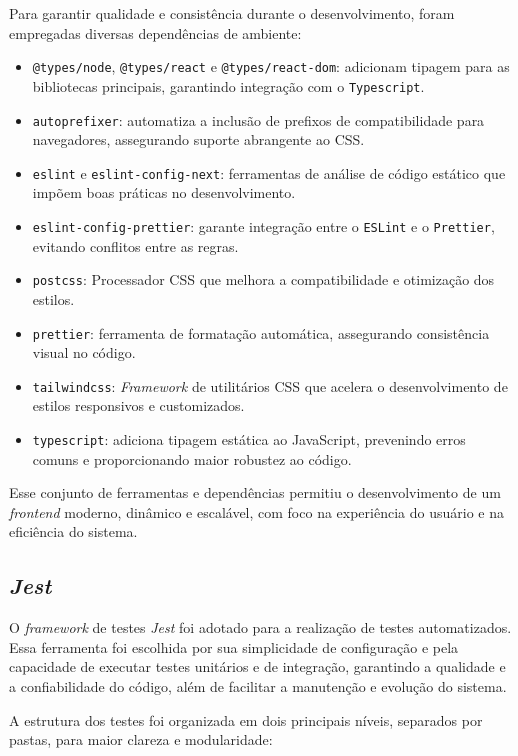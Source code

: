 Para garantir qualidade e consistência durante o desenvolvimento, foram empregadas diversas dependências de ambiente:

\begin{itemize} 
  \item \texttt{@types/node}, \texttt{@types/react} e \texttt{@types/react-dom}: adicionam tipagem para as bibliotecas principais, garantindo integração com o \texttt{Typescript}. 
  \item \texttt{autoprefixer}: automatiza a inclusão de prefixos de compatibilidade para navegadores, assegurando suporte abrangente ao CSS. 
  \item \texttt{eslint} e \texttt{eslint-config-next}: ferramentas de análise de código estático que impõem boas práticas no desenvolvimento. 
  \item \texttt{eslint-config-prettier}: garante integração entre o \texttt{ESLint} e o \texttt{Prettier}, evitando conflitos entre as regras. 
  \item \texttt{postcss}: Processador CSS que melhora a compatibilidade e otimização dos estilos. 
  \item \texttt{prettier}: ferramenta de formatação automática, assegurando consistência visual no código. 
  \item \texttt{tailwindcss}: \textit{Framework} de utilitários CSS que acelera o desenvolvimento de estilos responsivos e customizados. 
  \item \texttt{typescript}: adiciona tipagem estática ao JavaScript, prevenindo erros comuns e proporcionando maior robustez ao código. \end{itemize}

Esse conjunto de ferramentas e dependências permitiu o desenvolvimento de um \textit{frontend} moderno, dinâmico e escalável, com foco na experiência do usuário e na eficiência do sistema.

\subsection{\textit{Jest}}
O \textit{framework} de testes \textit{Jest} foi adotado para a realização de testes automatizados. Essa ferramenta foi escolhida por sua simplicidade de configuração e pela capacidade de executar testes unitários e de integração, garantindo a qualidade e a confiabilidade do código, além de facilitar a manutenção e evolução do sistema.

A estrutura dos testes foi organizada em dois principais níveis, separados por pastas, para maior clareza e modularidade:

